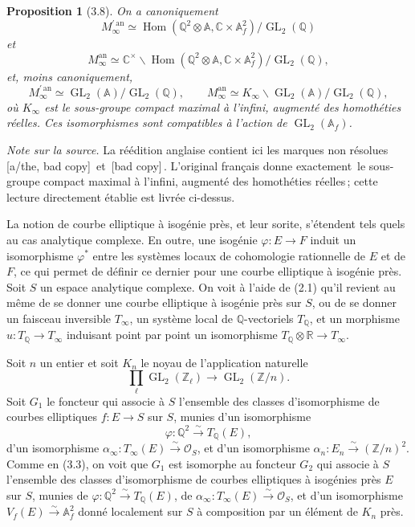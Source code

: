 \documentclass[10pt]{article}
\newcommand{\A}{\mathbb A}
\newcommand{\Af}{\mathbb A_f}
\newcommand{\C}{\mathbb C}
\newcommand{\Q}{\mathbb Q}
\newcommand{\R}{\mathbb R}
\newcommand{\Z}{\mathbb Z}
\newcommand{\GL}{\operatorname{GL}}
\newcommand{\Hom}{\operatorname{Hom}}
\newcommand{\cO}{\mathcal O}
\newcommand{\an}{\mathrm{an}}
\newcommand{\frquote}[1]{\guillemotleft{}\,#1\,\guillemotright{}}
\newtheorem*{proposition}{Proposition}
\begin{document}
\begin{proposition}[3.8]
On a canoniquement
\[
M_\infty^{\prime\,\an}\simeq
\Hom(\Q^2\otimes\A,\C\times\Af^2)/\GL_2(\Q)
\]
et
\[
M_\infty^{\an}\simeq
\C^\times\backslash\Hom(\Q^2\otimes\A,\C\times\Af^2)/\GL_2(\Q),
\]
et, moins canoniquement,
\[
M_\infty^{\prime\,\an}\simeq \GL_2(\A)/\GL_2(\Q),\qquad
M_\infty^{\an}\simeq K_\infty\backslash \GL_2(\A)/\GL_2(\Q),
\]
où $K_\infty$ est le sous-groupe compact maximal à l'infini, augmenté des homothéties
réelles. Ces
isomorphismes sont compatibles à l'action de $\GL_2(\Af)$.
\end{proposition}
\noindent\emph{Note sur la source.} La réédition anglaise contient ici les marques non résolues
\frquote{[a/the, bad copy]} et \frquote{[bad copy]}. L'original français donne exactement
\frquote{le sous-groupe compact maximal à l'infini, augmenté des homothéties réelles}; cette
lecture directement établie est livrée ci-dessus.

La notion de courbe elliptique à isogénie près, et leur sorite, s'étendent tels quels au cas
analytique complexe. En outre, une isogénie $\varphi:E\to F$ induit un isomorphisme $\varphi^*$
entre les systèmes locaux de cohomologie rationnelle de $E$ et de $F$, ce qui permet de
définir ce dernier pour une courbe elliptique à isogénie près. Soit $S$ un espace
analytique complexe. On voit à l'aide de (2.1) qu'il revient au même de se donner une courbe
elliptique à isogénie près sur $S$, ou de se donner un faisceau inversible $T_\infty$, un système local
de $\Q$-vectoriels $T_\Q$, et un morphisme $u:T_\Q\to T_\infty$ induisant
point par point un isomorphisme $T_\Q\otimes\R\to T_\infty$.

Soit $n$ un entier et soit $K_n$ le noyau de l'application naturelle
\[
\prod_\ell \GL_2(\Z_\ell)\to \GL_2(\Z/n).
\]
Soit $G_1$ le foncteur qui associe à $S$ l'ensemble des classes d'isomorphisme de courbes
elliptiques $f:E\to S$ sur $S$, munies d'un isomorphisme
\[
\varphi:\Q^2\xrightarrow{\sim}T_\Q(E),
\]
d'un isomorphisme $\alpha_\infty:T_\infty(E)\xrightarrow{\sim}\cO_S$, et d'un isomorphisme
$\alpha_n:E_n\xrightarrow{\sim}(\Z/n)^2$. Comme en (3.3), on voit que $G_1$ est
isomorphe au foncteur $G_2$ qui associe à $S$ l'ensemble des classes d'isomorphisme de
courbes elliptiques à isogénies près $E$ sur $S$, munies de
$\varphi:\Q^2\xrightarrow{\sim}T_\Q(E)$, de
$\alpha_\infty:T_\infty(E)\xrightarrow{\sim}\cO_S$, et d'un isomorphisme
$V_f(E)\xrightarrow{\sim}\Af^2$ donné localement sur $S$ à composition par un élément de
$K_n$ près.
\end{document}
